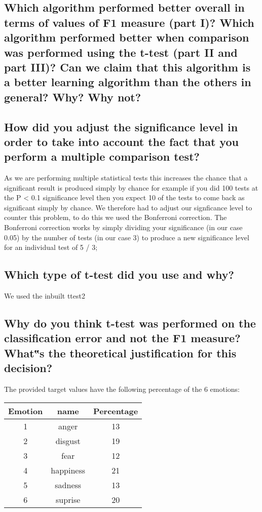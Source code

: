 \documentclass[11pt]{article}
\begin{document}
\subsection{Which algorithm performed better overall in terms of values of F1 measure (part I)? Which algorithm performed better when comparison was performed using the t-test (part II and part III)? Can we claim that this algorithm is a better learning algorithm than the others in general? Why? Why not?}

\subsection{How did you adjust the significance level in order to take into account the fact that you perform a multiple comparison test?}
As we are performing multiple statistical tests this increases the chance that a significant result is produced simply by chance for example if you did 100 tests at the P < 0.1 significance level then you expect 10 of the 
tests to come back as significant simply by chance. We therefore had to adjust our signficance level to counter this problem, to do this we used the Bonferroni correction. The Bonferroni correction works by simply dividing
your significance (in our case 0.05) by the number of tests (in our case 3) to produce a new significance level for an individual test of 5 / 3; 

\subsection{Which type of t-test did you use and why?}

We used the inbuilt ttest2

\subsection{Why do you think t-test was performed on the classification error and not the F1 measure? What‟s the theoretical justification for this decision?}

The provided target values have the following percentage of the 6 emotions:

\begin{tabular}{c c c} %
\hline\hline %
Emotion & name & Percentage\\ [0.5ex] %
\hline %
1 & anger     & 13 \\ %
2 & disgust   & 19 \\
3 & fear      & 12 \\
4 & happiness & 21 \\
5 & sadness   & 13 \\ 
6 & suprise   & 20 \\ [1ex] %
\hline %
\end{tabular}
\end{document}
